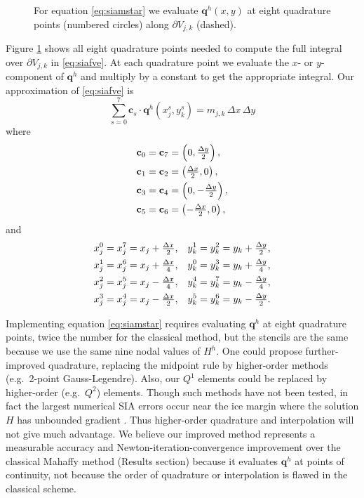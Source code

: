 \documentclass[review,letterpaper]{igs}
\newcommand\bc{\mathbf{c}}
\newcommand\bq{\mathbf{q}}
\begin{document}
\begin{figure}[ht]
\begin{center}

\end{center}
\caption{For equation \eqref{eq:siamstar} we evaluate $\bq^h(x,y)$ at eight quadrature points (numbered circles) along $\partial V_{j,k}$ (dashed).}
\label{fig:improvequadrature}
\end{figure}

Figure \ref{fig:improvequadrature} shows all eight quadrature points needed to compute the full integral over $\partial V_{j,k}$ in \eqref{eq:siafve}.  At each quadrature point we evaluate the $x$- or $y$-component of $\bq^h$ and multiply by a constant to get the appropriate integral.  Our approximation of \eqref{eq:siafve} is
\begin{equation}
\sum_{s=0}^7 \bc_s \cdot \bq^h(x_j^s,y_k^s) = m_{j,k}\,\Delta x\,\Delta y  \label{eq:siamstar}
\end{equation}
where
\begin{align}
\bc_0 &= \bc_7 = \left(0, \tfrac{\Delta y}{2}\right),  \label{eq:cs} \\
\bc_1 &= \bc_2 = \left(\tfrac{\Delta x}{2},0\right),  \notag \\
\bc_3 &= \bc_4 = \left(0, -\tfrac{\Delta y}{2}\right),  \notag \\
\bc_5 &= \bc_6 = \left(-\tfrac{\Delta x}{2},0\right),  \notag
\end{align}
and
\begin{align}
x_j^0 &= x_j^7 = x_j + \tfrac{\Delta x}{2}, & y_k^1 &= y_k^2 = y_k + \tfrac{\Delta y}{2}, \label{eq:xjsyks} \\
x_j^1 &= x_j^6 = x_j + \tfrac{\Delta x}{4}, & y_k^0 &= y_k^3 = y_k + \tfrac{\Delta y}{4}, \notag \\
x_j^2 &= x_j^5 = x_j - \tfrac{\Delta x}{4}, & y_k^4 &= y_k^7 = y_k - \tfrac{\Delta y}{4}, \notag \\
x_j^3 &= x_j^4 = x_j - \tfrac{\Delta x}{2}, & y_k^5 &= y_k^6 = y_k - \tfrac{\Delta y}{2}. \notag
\end{align}

Implementing equation \eqref{eq:siamstar} requires evaluating $\bq^h$ at eight quadrature points, twice the number for the classical method, but the stencils are the same because we use the same nine nodal values of $H^h$.  One could propose further-improved quadrature, replacing the midpoint rule by higher-order methods (e.g.~2-point Gauss-Legendre).  Also, our $Q^1$ elements could be replaced by higher-order (e.g.~$Q^2$) elements.  Though such methods have not been tested, in fact the largest numerical SIA errors occur near the ice margin where the solution $H$ has unbounded gradient \citep{Bueleretal2005}.  Thus higher-order quadrature and interpolation will not give much advantage.  We believe our improved method represents a measurable accuracy and Newton-iteration-convergence improvement over the classical Mahaffy method (Results section) because it evaluates $\bq^h$ at points of continuity, not because the order of quadrature or interpolation is flawed in the classical scheme.
\end{document}
